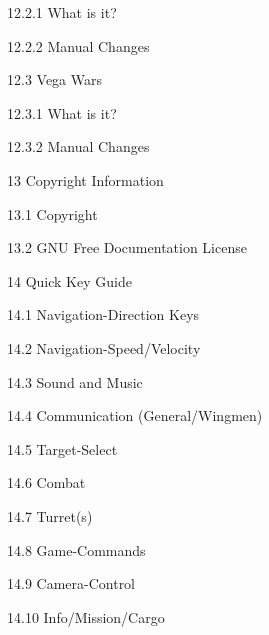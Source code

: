 \documentclass{article}
\begin{document}
12.2.1 What is it? 



12.2.2 Manual Changes 



12.3 Vega Wars   



12.3.1 What is it? 



12.3.2 Manual Changes 



13 Copyright Information



13.1 Copyright 



13.2 GNU Free Documentation License 



14 Quick Key Guide 

14.1 Navigation-Direction Keys



14.2 Navigation-Speed/Velocity



14.3 Sound and Music  

14.4 Communication (General/Wingmen) 

 

14.5 Target-Select

 

14.6 Combat



14.7 Turret(s) 



14.8 Game-Commands



14.9 Camera-Control 



14.10 Info/Mission/Cargo
\end{document}
